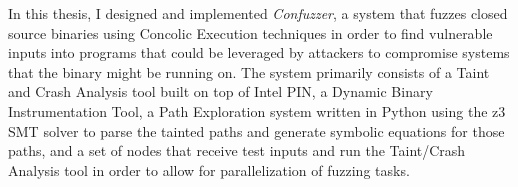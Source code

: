 In this thesis, I designed and implemented \textit{Confuzzer}, a system that
fuzzes closed source binaries using Concolic Execution techniques in order to
find vulnerable inputs into programs that could be leveraged by attackers to
compromise systems that the binary might be running on. The system primarily
consists of a Taint and Crash Analysis tool built on top of Intel PIN, a Dynamic
Binary Instrumentation Tool, a Path Exploration system written in Python using
the z3 SMT solver to parse the tainted paths and generate symbolic equations for
those paths, and a set of nodes that receive test inputs and run the Taint/Crash
Analysis tool in order to allow for parallelization of fuzzing tasks.
